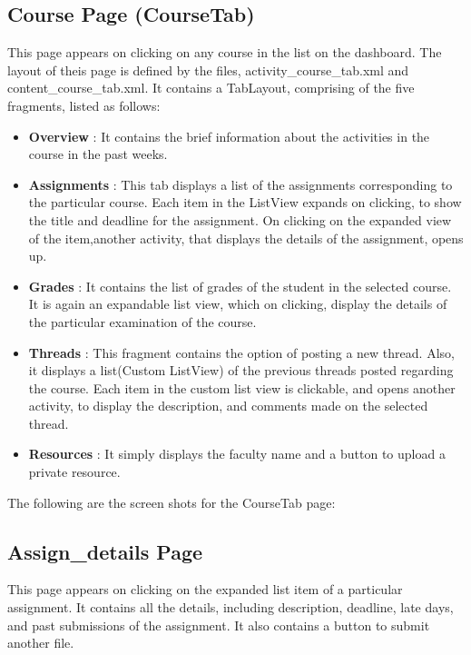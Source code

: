 \documentclass{article}
\begin{document}
\subsection{Course Page (CourseTab)}
\par\noindent This page appears on clicking on any course in the list on the dashboard. The layout of theis page is defined by the files, activity\_course\_tab.xml and content\_course\_tab.xml. It contains a TabLayout, comprising of the five fragments, listed as follows:
\begin{itemize}
\item \textbf{Overview} : It contains the brief information about the activities in the course in the past weeks.
\item \textbf{Assignments} : This tab displays a list of the assignments corresponding to the particular course. Each item in the ListView expands on clicking, to show the title and deadline for the assignment. On clicking on the expanded view of the item,another activity, that displays the details of the assignment, opens up.
\item \textbf{Grades} : It contains the list of grades of the student in the selected course. It is again an expandable list view, which on clicking, display the details of the particular examination of the course.
\item \textbf{Threads} : This fragment contains the option of posting a new thread. Also, it displays a list(Custom ListView) of the previous threads posted regarding the course. Each item in the custom list view is clickable, and opens another activity, to display the description, and comments made on the selected thread.
\item \textbf{Resources} : It simply displays the faculty name and a button to upload a private resource.
\end{itemize}
\par\noindent The following are the screen shots for the CourseTab page:
\subsection{Assign\_details Page}
\par\noindent This page appears on clicking on the expanded list item of a particular assignment. It contains all the details, including description, deadline, late days, and past submissions of the assignment.
It also contains a button to submit another file.
\end{document}
